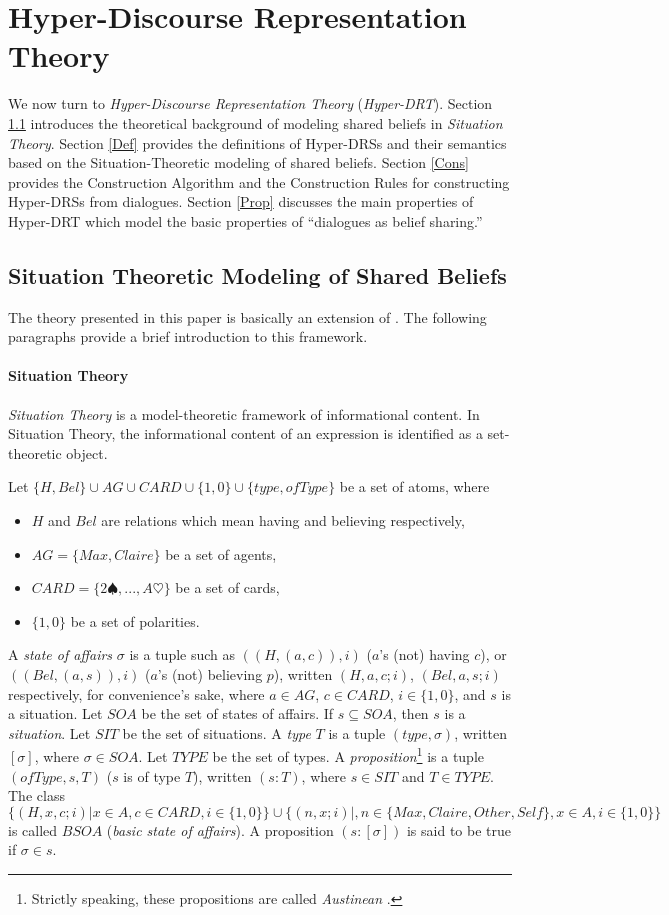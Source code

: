 \section{Hyper-Discourse Representation Theory}\label{hdrs}
We now turn to {\it Hyper-Discourse Representation Theory} ({\it Hyper-DRT}).
Section \ref{theo} introduces the theoretical background of modeling shared beliefs in {\it Situation Theory}.
Section \ref{Def} provides the definitions of Hyper-DRSs and their semantics based on the Situation-Theoretic modeling of shared beliefs.
Section \ref{Cons} provides the Construction Algorithm and the Construction Rules for constructing Hyper-DRSs from dialogues.
Section \ref{Prop} discusses the main properties of Hyper-DRT which model the basic properties of ``dialogues as belief sharing.''
\clearpage
\subsection{Situation Theoretic Modeling of Shared Beliefs}\label{theo}
The theory presented in this paper is basically an extension of \cite{BE87}.
The following paragraphs provide a brief introduction to this framework.
\paragraph{Situation Theory}
{\it Situation Theory} \cite{BP83,BE87,Bar89} is a model-theoretic framework of informational content.
In Situation Theory, the informational content of an expression is identified as a set-theoretic object.
\par
Let $\{H,Bel\}\cup AG\cup CARD\cup \{1,0\}\cup\{type,ofType\}$ be a set of atoms, where 
\begin{itemize}
\item $H$ and $Bel$ are relations which mean having and believing respectively,
\item $AG=\{Max,Claire\}$ be a set of agents,
\item $CARD=\{2\spadesuit,...,A\heartsuit\}$ be a set of cards,
\item $\{1,0\}$ be a set of polarities.
\end{itemize}
A {\it state of affairs} $\sigma$ is a tuple such as $((H,(a,c)),i)$ ($a$'s (not) having $c$), or $((Bel,(a,s)),i)$ ($a$'s (not) believing $p$), written $(H,a,c;i)$, $(Bel,a,s;i)$ respectively, for convenience's sake, where $a\in AG$, $c\in CARD$, $i\in \{1,0\}$, and $s$ is a situation.
Let $SOA$ be the set of states of affairs.
If $s\subseteq SOA$, then $s$ is a {\it situation}.
Let $SIT$ be the set of situations.
A {\it type} $T$ is a tuple $(type,\sigma)$, written $[\sigma]$, where $\sigma\in SOA$.
Let $TYPE$ be the set of types.
A {\it proposition}\<\footnote{
Strictly speaking, these propositions are called {\it Austinean} \cite{BE87,Bar89}.}
is a tuple $(ofType,s,T)$ ($s$ is of type $T$), written $(s:T)$, where $s\in SIT$ and $T\in TYPE$.
The class $\{(H,x,c;i)|x\in A, c\in CARD,i\in\{1,0\}\}\cup \{(n,x;i)|,n\in\{Max,Claire,Other,Self\},x\in A,i\in\{1,0\}\}$ is called $BSOA$ ({\it basic state of affairs}).
A proposition $(s:[\sigma])$ is said to be true if $\sigma\in s$.
